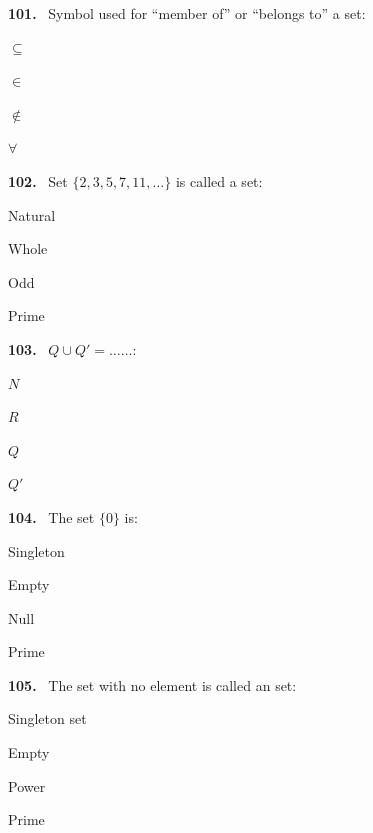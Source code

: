 \documentclass[11pt]{article}
\newenvironment{qenv}[1]{%
  \par\medskip\noindent\textbf{#1.}\ \ignorespaces
}{\par}
\begin{document}
\begin{qenv}{101} Symbol used for ``member of'' or ``belongs to'' a set:
\begin{options} \item $\subseteq$ \item $\in$ \item $\notin$ \item $\forall$ \end{options} \end{qenv}

\begin{qenv}{102} Set $\{2,3,5,7,11,\ldots\}$ is called a \underline{\hspace{2cm}} set:
\begin{options} \item Natural \item Whole \item Odd \item Prime \end{options} \end{qenv}

\begin{qenv}{103} $Q \cup Q' = \ldots\ldots$:
\begin{options} \item $N$ \item $R$ \item $Q$ \item $Q'$ \end{options} \end{qenv}

\begin{qenv}{104} The set $\{0\}$ is:
\begin{options} \item Singleton \item Empty \item Null \item Prime \end{options} \end{qenv}

\begin{qenv}{105} The set with no element is called an \underline{\hspace{2cm}} set:
\begin{options} \item Singleton set \item Empty \item Power \item Prime \end{options} \end{qenv}
\end{document}
